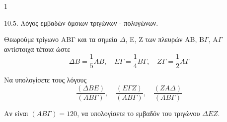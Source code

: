 \begin{ylh}{1}
    \item 10.5. Λόγος εμβαδών όμοιων τριγώνων - πολυγώνων.
\end{ylh}
\begin{figure}
\end{figure}

Θεωρούμε τρίγωνο ΑΒΓ και τα σημεία \(\Delta\), E, Z των πλευρών AB, B\(\Gamma\), A\(\Gamma\) αντίστοιχα τέτοια ώστε
\[ \Delta B = \frac{1}{5} AB, \quad E\Gamma = \frac{1}{4} B\Gamma, \quad Z\Gamma = \frac{1}{2} A\Gamma \]
\begin{alist}
\item Να υπολογίσετε τους λόγους
\[ \frac{(\Delta BE)}{(AB\Gamma)}, \quad \frac{(E\Gamma Z)}{(AB\Gamma)}, \quad \frac{(ZA\Delta)}{(AB\Gamma)} \] 
\item Αν είναι \( (AB\Gamma) = 120 \), να υπολογίσετε το εμβαδόν του τριγώνου \(\Delta EZ\). 
\end{alist}